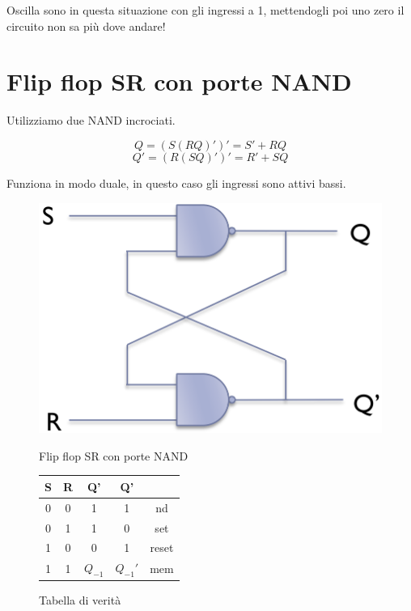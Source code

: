 Oscilla sono in questa situazione con gli ingressi a 1, mettendogli poi uno zero il circuito non sa più dove andare!


\section{Flip flop SR con porte NAND}

Utilizziamo due NAND incrociati.


\begin{equation*}
    Q = (S(RQ)')' = S' + RQ
\end{equation*}
\begin{equation*}
    Q' = (R(SQ)')' = R' + SQ
\end{equation*}

Funziona in modo duale, in questo caso gli ingressi sono attivi bassi.


\begin{figure}[htbp]
    \begin{minipage}[htbp]{0.5\textwidth}
    \centering
        \includegraphics[width=0.8\linewidth]{img/NANDD.png}
        \caption{Flip flop SR con porte NAND}
    \end{minipage}
    \begin{minipage}[htbp]{0.5\textwidth}
    \centering

    \begin{tabular}{cc|ccc}
        S & R & Q' & Q' & \\
        \hline
        0 & 0 & 1 & 1 & nd\\
        0 & 1 & 1 & 0 & set\\
        1 & 0 & 0 & 1 & reset\\
        1 & 1 & $Q_{-1}$ & $Q_{-1}'$ & mem\\
    \end{tabular}
    \caption{Tabella di verità}
    
    \end{minipage}
\end{figure}

